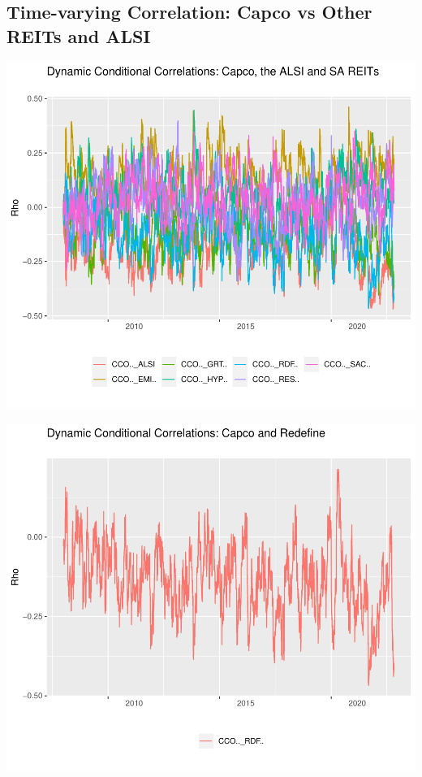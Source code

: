 \documentclass[11pt,preprint, authoryear]{elsarticle}
\let\origfigure\figure
\let\endorigfigure\endfigure
\renewenvironment{figure}[1][2] {
    \expandafter\origfigure\expandafter[H]
} {
    \endorigfigure
}
\numberwithin{equation}{section}
\numberwithin{figure}{section}
\numberwithin{table}{section}
\begin{document}
\hypertarget{time-varying-correlation-capco-vs-other-reits-and-alsi}{%
\subsection{Time-varying Correlation: Capco vs Other REITs and
ALSI}\label{time-varying-correlation-capco-vs-other-reits-and-alsi}}

\begin{figure}
\centering
\includegraphics{Fin_Metrics_Project_files/figure-latex/unnamed-chunk-13-1.pdf}
\caption{Dynamic Conditional Correlations Graph}
\end{figure}

\begin{figure}
\centering
\includegraphics{Fin_Metrics_Project_files/figure-latex/unnamed-chunk-14-1.pdf}
\caption{Dynamic Conditional Correlations Graph}
\end{figure}
\end{document}
